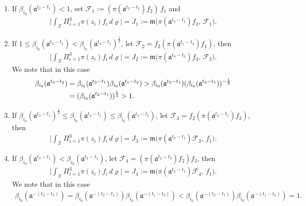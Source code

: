 \documentclass[11 pt]{amsart}
\theoremstyle{definition}
\numberwithin{equation}{section}
\begin{document}
\begin{enumerate}
  \item If $\beta_{i_0}(\mathfrak{a}^{t_{2}-t_{1}})<1$, set $\mathcal{F}_1:=(\pi(\mathfrak{a}^{t_{2}-t_{1}})f_2)\,f_1$ and
  \begin{align*}
 \Big|\int_{\mathcal{X}} \Pi_{i=1}^{3} \pi(z_i)f_i \,d\varrho \Big|=J_1:=\mathfrak{m}\big(\pi(\mathfrak{a}^{t_{3}-t_{ 1}})f_3,\,\mathcal{F}_1\big).
\end{align*}
  \item If $1\leq\beta_{i_0}(\mathfrak{a}^{t_{2}-t_{1}})<\beta_{i_0}(\mathfrak{a}^{t_{3}-t_{1}})^{\frac{1}{2}} $, let $\mathcal{F}_2=f_2(\pi(\mathfrak{a}^{t_{1}-t_{ 2}})f_1)$, then
      \begin{align*}
 \Big|\int_{\mathcal{X}} \Pi_{i=1}^{3} \pi(z_i)f_i \,d\varrho \Big|=J_2:=\mathfrak{m}\big(\pi(\mathfrak{a}^{t_{3}-t_{ 2}})f_3,\,\mathcal{F}_2\big).
\end{align*}
We note that in this case
\begin{align}\label{for:151}
    \beta_{i_0}(\mathfrak{a}^{t_3-t_{2}})&=\beta_{i_0}(\mathfrak{a}^{t_3-t_{1}})\beta_{i_0}(\mathfrak{a}^{t_1-t_{2}})
    >\beta_{i_0}(\mathfrak{a}^{t_3-t_{1}})  (\beta_{i_0}(\mathfrak{a}^{t_3-t_{1}}))^{-\frac{1}{2}}\notag\\
    &=(\beta_{i_0}(\mathfrak{a}^{t_3-t_{1}}))^{\frac{1}{2}}>1.
  \end{align}


  \item If $\beta_{i_0}(\mathfrak{a}^{t_{3}-t_{1}})^{\frac{1}{2}}\leq\beta_{i_0}(\mathfrak{a}^{t_{2}-t_{1}})\leq \beta_{i_0}(\mathfrak{a}^{t_{3}-t_{2}})$, let $\mathcal{F}_3=f_2(\pi(\mathfrak{a}^{t_{3}-t_{ 1}})f_3)$, then \begin{align*}
 \Big|\int_{\mathcal{X}} \Pi_{i=1}^{3} \pi(z_i)f_i \,d\varrho \Big|=J_3:=\mathfrak{m}\big(\pi(\mathfrak{a}^{t_{2}-t_{ 1}})\mathcal{F}_3,\,f_1\big).
\end{align*}
  \item If $\beta_{i_0}(\mathfrak{a}^{t_{3}-t_{1}})<\beta_{i_0}(\mathfrak{a}^{t_{2}-t_{1}})$, let $\mathcal{F}_4=(\pi(\mathfrak{a}^{t_{2}-t_{ 3}})f_2)f_3$, then
  \begin{align*}
 \Big|\int_{\mathcal{X}} \Pi_{i=1}^{3} \pi(z_i)f_i \,d\varrho \Big|=J_4:=\mathfrak{m}\big(\pi(\mathfrak{a}^{t_{3}-t_{ 1}})\mathcal{F}_4,\,f_1\big).
\end{align*}
We note that in this case
\begin{align}\label{for:152}
  \beta_{i_0}(\mathfrak{a}^{-(t_{2}-t_{ 3})})=\beta_{i_0}(\mathfrak{a}^{-(t_{2}-t_{ 1})})\beta_{i_0}(\mathfrak{a}^{-(t_{1}-t_{3})})<\beta_{i_0}(\mathfrak{a}^{-(t_{3}-t_{ 1})})\beta_{i_0}(\mathfrak{a}^{-(t_{1}-t_{3})})=1.
 \end{align}
\end{enumerate}
\end{document}

